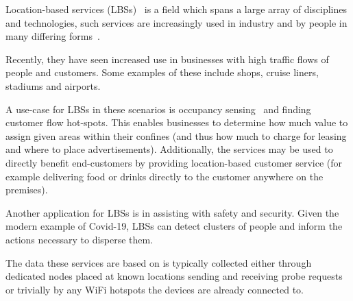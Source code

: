 Location-based services (LBSs)~\cite{schiller2004location, junglas2008location, dey2009location, kupper2005location} is a field which spans a large array of disciplines and technologies, such services are increasingly used in industry and by people in many differing forms~\cite{zickuhr2013location}.

Recently, they have seen increased use in businesses with high traffic flows of people and customers.
Some examples of these include shops, cruise liners, stadiums and airports.

A use-case for LBSs in these scenarios is occupancy sensing~\cite{shen2020wi} and finding customer flow hot-spots.
This enables businesses to determine how much value to assign given areas within their confines (and thus how much to charge for leasing and where to place advertisements).
Additionally, the services may be used to directly benefit end-customers by providing location-based customer service (for example delivering food or drinks directly to the customer anywhere on the premises).

Another application for LBSs is in assisting with safety and security.
Given the modern example of Covid-19, LBSs can detect clusters of people and inform the actions necessary to disperse them.

The data these services are based on is typically collected either through dedicated nodes placed at known locations sending and receiving probe requests or trivially by any WiFi hotspots the devices are already connected to.
